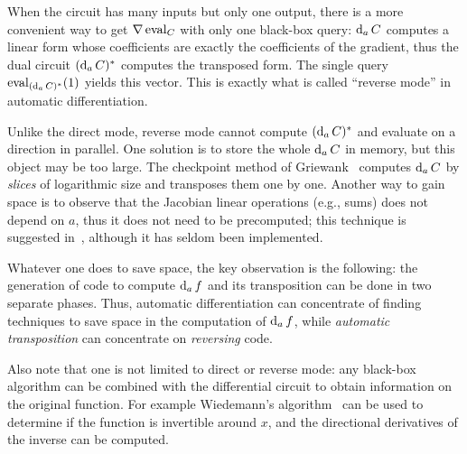 When the circuit has many inputs but only one output, there is a more
convenient way to get $\nabla \operatorname{eval}_C$ with only one black-box query:
$\operatorname{d}_aC$ computes a linear form whose coefficients are exactly the
coefficients of the gradient, thus the dual circuit
$(\operatorname{d}_aC)^\ast$ computes the transposed form. The single query
$\operatorname{eval}_{(\operatorname{d}_aC)^\ast}(1)$ yields this vector. This is exactly
what is called ``reverse mode'' in automatic differentiation. 

\begin{remark}
  Unlike the direct mode, reverse mode cannot compute
  $(\operatorname{d}_aC)^\ast$ and evaluate on a direction in parallel. One
  solution is to store the whole $\operatorname{d}_aC$ in memory, but this object
  may be too large. The checkpoint method of
  Griewank~\cite{griewank92} computes $\operatorname{d}_aC$ by \emph{slices} of
  logarithmic size and transposes them one by one. Another way to gain
  space is to observe that the Jacobian linear operations (e.g., sums)
  does not depend on $a$, thus it does not need to be precomputed;
  this technique is suggested in~\cite{gilbert+levey+masse91},
  although it has seldom been implemented.

  Whatever one does to save space, the key observation is the
  following: the generation of code to compute $\operatorname{d}_a f$ and its
  transposition can be done in two separate phases. Thus, automatic
  differentiation can concentrate of finding techniques to save space
  in the computation of $\operatorname{d}_a f$, while
  \emph{automatic transposition} can
  concentrate on \emph{reversing} code.
\end{remark}

\begin{nota}
  Also note that one is not limited to direct or reverse mode: any
  black-box algorithm can be combined with the differential circuit to
  obtain information on the original function. For example Wiedemann's
  algorithm~\cite{wiedemann:sparse} can be used to determine if the
  function is invertible around $x$, and the directional derivatives
  of the inverse can be computed.
\end{nota}




%
